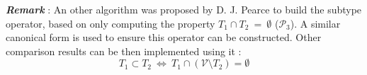 \documentclass[10pt,a4paper]{article}
\newcommand{\val}{\mathcal V}
\newcommand{\Dfrac}[2]{%
	\ooalign{%
		$\genfrac{}{}{2.4pt}0{\phantom{#1}}{\phantom{#2}}$\cr%
		$\genfrac{}{}{.8pt}0{#1}{#2}$\cr%
		$\color{white}\genfrac{}{}{.8pt}0{\phantom{#1}}{\phantom{#2}}$}
}
\begin{document}
%
%
%
%
%
%


\textbf{\textit{Remark}} : An other algorithm was proposed by D. J. Pearce \cite{SubTyping} to build the subtype operator, based on only computing the property $T_1 \cap T_2 ~=~ \emptyset$ ($\mathcal P_3$). A similar canonical form is used to ensure this operator can be constructed. Other comparison results can be then implemented using it :
\[
	T_1 \subset T_2 ~\Leftrightarrow~ T_1 \cap (\val \setminus T_2) = \emptyset
\]
\end{document}
